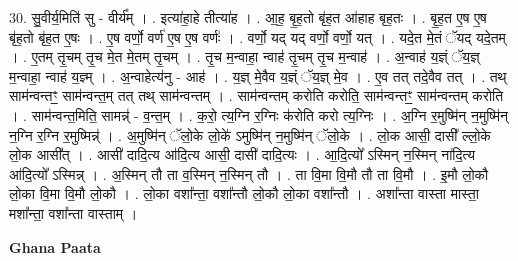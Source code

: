 \documentclass[17pt]{extarticle}
\begin{document}
30. सु॒वीर्य॒मिति॑ सु - वीर्य᳚म् । . इत्या॑हा॒हे तीत्या॑ह । . आ॒ह॒ बृ॒ह॒तो बृ॑ह॒त आ॑हाह बृह॒तः । . बृ॒ह॒त ए॒ष ए॒ष बृ॑ह॒तो बृ॑ह॒त ए॒षः । . ए॒ष वर्णो॒ वर्ण॑ ए॒ष ए॒ष वर्णः॑ । . वर्णो॒ यद् यद् वर्णो॒ वर्णो॒ यत् । . यदे॒त मे॒तं ॅयद् यदे॒तम् । . ए॒तम् तृ॒चम् तृ॒च मे॒त मे॒तम् तृ॒चम् । . तृ॒च म॒न्वाहा॒ न्वाह॑ तृ॒चम् तृ॒च म॒न्वाह॑ । . अ॒न्वाह॑ य॒ज्ञ्ं ॅय॒ज्ञ् म॒न्वाहा॒ न्वाह॑ य॒ज्ञ्म् । . अ॒न्वाहेत्य॑नु - आह॑ । . य॒ज्ञ् मे॒वैव य॒ज्ञ्ं ॅय॒ज्ञ् मे॒व । . ए॒व तत् तदे॒वैव तत् । . तथ् साम॑न्वन्तꣳ॒॒ साम॑न्वन्त॒म् तत् तथ् साम॑न्वन्तम् । . साम॑न्वन्तम् करोति करोति॒ साम॑न्वन्तꣳ॒॒ साम॑न्वन्तम् करोति । . साम॑न्वन्त॒मिति॒ सामन्न्॑ - व॒न्त॒म् । . क॒रो॒ त्य॒ग्नि र॒ग्निः क॑रोति करो त्य॒ग्निः । . अ॒ग्नि र॒मुष्मि॑न् न॒मुष्मि॑न् न॒ग्नि र॒ग्नि र॒मुष्मिन्न्॑ । . अ॒मुष्मि॑न् ॅलो॒के लो॒के॑ ऽमुष्मि॑न् न॒मुष्मि॑न् ॅलो॒के । . लो॒क आसी॒ दासी᳚ ल्लो॒के लो॒क आसी᳚त् । . आसी॑ दादि॒त्य आ॑दि॒त्य आसी॒ दासी॑ दादि॒त्यः । . आ॒दि॒त्यो᳚ ऽस्मिन् न॒स्मिन् ना॑दि॒त्य आ॑दि॒त्यो᳚ ऽस्मिन्न् । . अ॒स्मिन् तौ ता व॒स्मिन् न॒स्मिन् तौ । . ता वि॒मा वि॒मौ तौ ता वि॒मौ । . इ॒मौ लो॒कौ लो॒का वि॒मा वि॒मौ लो॒कौ । . लो॒का वशा᳚न्ता॒ वशा᳚न्तौ लो॒कौ लो॒का वशा᳚न्तौ । . अशा᳚न्ता वास्ता मास्ता॒ मशा᳚न्ता॒ वशा᳚न्ता वास्ताम् । \newline

\textbf{Ghana Paata } \newline
\end{document}
